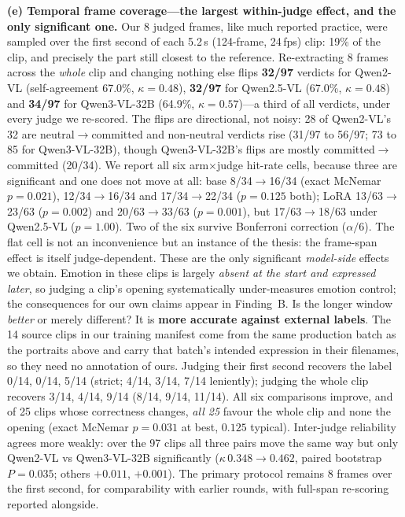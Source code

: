 \documentclass[conference]{IEEEtran}
\begin{document}
\textbf{(e) Temporal frame coverage---the largest within-judge effect, and the only significant one.} Our 8 judged
frames, like much reported practice, were sampled over the first second of each 5.2\,s (124-frame,
24\,fps) clip: 19\% of the clip, and precisely the part still closest to the reference. Re-extracting 8
frames across the \emph{whole} clip and changing nothing else flips \textbf{32/97} verdicts for Qwen2-VL
(self-agreement 67.0\%, $\kappa{=}0.48$), \textbf{32/97} for Qwen2.5-VL (67.0\%, $\kappa{=}0.48$) and
\textbf{34/97} for Qwen3-VL-32B (64.9\%, $\kappa{=}0.57$)---a third of all verdicts, under every judge we
re-scored. The flips are directional, not noisy: 28 of Qwen2-VL's 32 are neutral$\rightarrow$committed and
non-neutral verdicts rise (31/97 to 56/97; 73 to 85 for Qwen3-VL-32B), though Qwen3-VL-32B's flips are
mostly committed$\rightarrow$committed (20/34). We report all six arm$\times$judge hit-rate cells, because
three are significant and one does not move at all: base 8/34$\rightarrow$16/34 (exact McNemar
$p{=}0.021$), 12/34$\rightarrow$16/34 and 17/34$\rightarrow$22/34 ($p{=}0.125$ both); LoRA
13/63$\rightarrow$23/63 ($p{=}0.002$) and 20/63$\rightarrow$33/63 ($p{=}0.001$), but
17/63$\rightarrow$18/63 under Qwen2.5-VL ($p{=}1.00$). Two of the six survive Bonferroni correction
($\alpha/6$). The flat cell is not an inconvenience but an instance of the thesis: the frame-span effect
is itself judge-dependent. These are the only significant \emph{model-side} effects we obtain. Emotion in
these clips is largely \emph{absent at the start and expressed later}, so judging a clip's opening
systematically under-measures emotion control; the consequences for our own claims appear in Finding~B.
Is the longer window \emph{better} or merely different? It is
\textbf{more accurate against external labels}. The 14 source clips in our training manifest come from the same
production batch as the portraits above and carry that batch's intended expression in their filenames, so
they need no annotation of ours. Judging their first second recovers the label 0/14, 0/14, 5/14 (strict;
4/14, 3/14, 7/14 leniently); judging the whole clip recovers 3/14, 4/14, 9/14 (8/14, 9/14, 11/14). All six comparisons improve, and
of 25 clips whose correctness changes, \emph{all 25} favour the whole clip and none the opening (exact
McNemar $p{=}0.031$ at best, $0.125$ typical). Inter-judge reliability agrees more weakly: over the 97
clips all three pairs move the same way but only Qwen2-VL vs Qwen3-VL-32B significantly
($\kappa\,0.348{\rightarrow}0.462$, paired bootstrap $P{=}0.035$; others $+0.011$, $+0.001$).
The primary protocol remains 8 frames over the first second, for comparability with earlier rounds, with
full-span re-scoring reported alongside.
\end{document}
